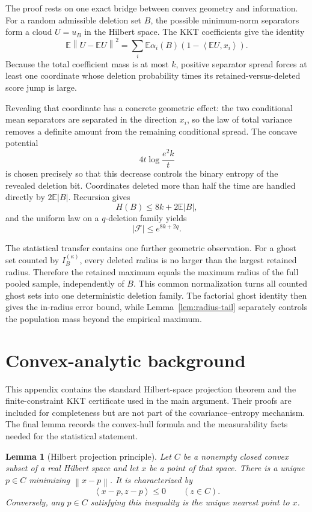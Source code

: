 \documentclass[11pt]{article}
\newtheorem{lemma}[theorem]{Lemma}
\theoremstyle{definition}
\theoremstyle{remark}
\newcommand{\E}{\mathbb E}
\newcommand{\ip}[2]{\left\langle #1,#2\right\rangle}
\newcommand{\norm}[1]{\left\lVert #1\right\rVert}
\begin{document}
The proof rests on one exact bridge between convex geometry and information.
For a random admissible deletion set \(B\), the possible minimum-norm
separators form a cloud \(U=u_B\) in the Hilbert space. The KKT coefficients
give the identity
\[
 \E\norm{U-\E U}^2
 =
 \sum_i\E\alpha_i(B)
 \left(
   1-\ip{\E U}{x_i}
 \right).
\]
Because the total coefficient mass is at most \(k\), positive separator
spread forces at least one coordinate whose deletion probability times its
retained-versus-deleted score jump is large.

Revealing that coordinate has a concrete geometric effect: the two
conditional mean separators are separated in the direction \(x_i\), so the
law of total variance removes a definite amount from the remaining
conditional spread. The concave potential
\[
 4t\log\frac{e^2k}{t}
\]
is chosen precisely so that this decrease controls the binary entropy of the
revealed deletion bit. Coordinates deleted more than half the time are
handled directly by \(2\E|B|\). Recursion gives
\[
 H(B)\le8k+2\E|B|,
\]
and the uniform law on a \(q\)-deletion family yields
\[
 |\mathcal F|\le e^{8k+2q}.
\]

The statistical transfer contains one further geometric observation. For a
ghost set counted by \(I_B^{(\kappa)}\), every deleted radius is no larger
than the largest retained radius. Therefore the retained maximum equals the
maximum radius of the full pooled sample, independently of \(B\). This
common normalization turns all counted ghost sets into one deterministic
deletion family. The factorial ghost identity then gives the in-radius error
bound, while Lemma~\ref{lem:radius-tail} separately controls the population
mass beyond the empirical maximum.

\appendix

\section{Convex-analytic background}
\label{sec:convex-appendix}

This appendix contains the standard Hilbert-space projection theorem and the
finite-constraint KKT certificate used in the main argument. Their proofs
are included for completeness but are not part of the covariance--entropy
mechanism. The final lemma records the convex-hull formula and the
measurability facts needed for the statistical statement.

\begin{lemma}[Hilbert projection principle]
\label{lem:hilbert-projection}
Let \(C\) be a nonempty closed convex subset of a real Hilbert space and let
\(x\) be a point of that space. There is a unique \(p\in C\) minimizing
\(\norm{x-p}\). It is characterized by
\[
 \boxed{\ip{x-p}{z-p}\le0\qquad(z\in C).}
 \tag{A.1}
\]
Conversely, any \(p\in C\) satisfying this inequality is the unique nearest
point to \(x\).
\end{lemma}
\end{document}
